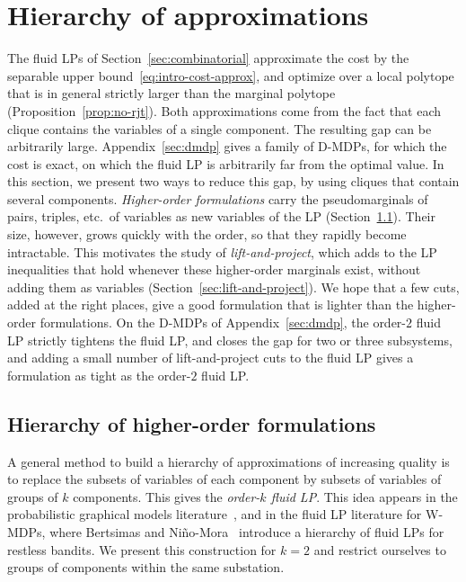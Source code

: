 \documentclass{article}
\begin{document}
\section{Hierarchy of approximations}
\label{sec:hierarchy}

\label{sec:why-gap}
The fluid LPs of Section~\ref{sec:combinatorial} approximate the cost by the separable upper
bound~\eqref{eq:intro-cost-approx}, and optimize over a local polytope that is in general strictly larger than the
marginal polytope (Proposition~\ref{prop:no-rjt}). Both approximations come from the fact that each clique contains the
variables of a single component. The resulting gap can be arbitrarily large. Appendix~\ref{sec:dmdp} gives a family of
D-MDPs, for which the cost is exact, on which the fluid LP is arbitrarily far from the optimal value. In this section,
we present two ways to reduce this gap, by using cliques that contain several components. \emph{Higher-order formulations} carry the pseudomarginals of pairs, triples, etc.\ of variables as new
variables of the LP (Section~\ref{sec:higher-order}). Their size, however, grows quickly with the order, so that they
rapidly become intractable. This motivates the study of \emph{lift-and-project}, which adds to the LP inequalities
that hold whenever these higher-order marginals exist, without adding them as variables
(Section~\ref{sec:lift-and-project}). We hope that a few cuts, added at the right places, give a good formulation that
is lighter than the higher-order formulations. On the D-MDPs of Appendix~\ref{sec:dmdp}, the order-$2$ fluid LP strictly
tightens the fluid LP, and closes the gap for two or three subsystems, and adding a small number of lift-and-project cuts to the fluid LP gives a formulation as tight as the
order-$2$ fluid LP.





\subsection{Hierarchy of higher-order formulations}
\label{sec:higher-order}

A general method to build a hierarchy of approximations of increasing quality is to replace the
subsets of variables of each component by subsets of variables of groups of $k$ components. This gives the
\emph{order-$k$ fluid LP}. This idea appears in the probabilistic graphical models literature~\cite[\S~8.5]{wainwright2008graphical}, and in the fluid LP
literature for W-MDPs, where Bertsimas and Niño-Mora~\cite{bertsimasninomora2000} introduce a hierarchy of fluid LPs
for restless bandits. We present this construction for $k = 2$ and restrict ourselves to groups of components within the
same substation.
\end{document}
